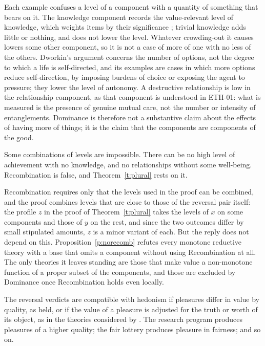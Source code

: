 \documentclass{situationist-preprint}
\begin{document}
\begin{reply}
Each example confuses a level of a component with a quantity of something that bears on it. The knowledge component records the value-relevant level of knowledge, which weights items by their significance \citep{Hurka1993}; trivial knowledge adds little or nothing, and does not lower the level. Whatever crowding-out it causes lowers some other component, so it is not a case of more of one with no less of the others. Dworkin's argument concerns the number of options, not the degree to which a life is self-directed, and its examples are cases in which more options reduce self-direction, by imposing burdens of choice or exposing the agent to pressure; they lower the level of autonomy. A destructive relationship is low in the relationship component, as that component is understood in ETH-01: what is measured is the presence of genuine mutual care, not the number or intensity of entanglements. Dominance is therefore not a substantive claim about the effects of having more of things; it is the claim that the components are components of the good.
\end{reply}

\begin{objection}[Recombination]\label{o:recomb}
Some combinations of levels are impossible. There can be no high level of achievement with no knowledge, and no relationships without some well-being. Recombination is false, and Theorem~\ref{t:plural} rests on it.
\end{objection}

\begin{reply}
Recombination requires only that the levels used in the proof can be combined, and the proof combines levels that are close to those of the reversal pair itself: the profile $z$ in the proof of Theorem~\ref{t:plural} takes the levels of $x$ on some components and those of $y$ on the rest, and since the two outcomes differ by small stipulated amounts, $z$ is a minor variant of each. But the reply does not depend on this. Proposition~\ref{p:norecomb} refutes every monotone reductive theory with a base that omits a component without using Recombination at all. The only theories it leaves standing are those that make value a non-monotone function of a proper subset of the components, and those are excluded by Dominance once Recombination holds even locally.
\end{reply}

\begin{objection}
The reversal verdicts are compatible with hedonism if pleasures differ in value by quality, as \citet{Mill1861} held, or if the value of a pleasure is adjusted for the truth or worth of its object, as in the theories considered by \citet{Feldman2004}. The research program produces pleasures of a higher quality; the fair lottery produces pleasure in fairness; and so on.
\end{objection}
\end{document}
